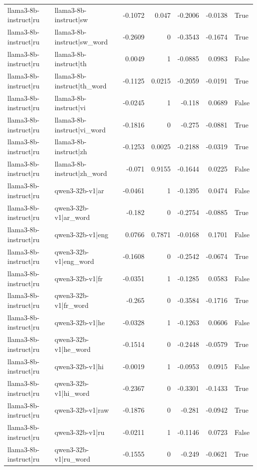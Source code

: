 \begin{table}
\begin{tabular}{l l r r r r l}
llama3-8b-instruct|ru & llama3-8b-instruct|sw & -0.1072 & 0.047 & -0.2006 & -0.0138 & True \\
llama3-8b-instruct|ru & llama3-8b-instruct|sw_word & -0.2609 & 0 & -0.3543 & -0.1674 & True \\
llama3-8b-instruct|ru & llama3-8b-instruct|th & 0.0049 & 1 & -0.0885 & 0.0983 & False \\
llama3-8b-instruct|ru & llama3-8b-instruct|th_word & -0.1125 & 0.0215 & -0.2059 & -0.0191 & True \\
llama3-8b-instruct|ru & llama3-8b-instruct|vi & -0.0245 & 1 & -0.118 & 0.0689 & False \\
llama3-8b-instruct|ru & llama3-8b-instruct|vi_word & -0.1816 & 0 & -0.275 & -0.0881 & True \\
llama3-8b-instruct|ru & llama3-8b-instruct|zh & -0.1253 & 0.0025 & -0.2188 & -0.0319 & True \\
llama3-8b-instruct|ru & llama3-8b-instruct|zh_word & -0.071 & 0.9155 & -0.1644 & 0.0225 & False \\
llama3-8b-instruct|ru & qwen3-32b-v1|ar & -0.0461 & 1 & -0.1395 & 0.0474 & False \\
llama3-8b-instruct|ru & qwen3-32b-v1|ar_word & -0.182 & 0 & -0.2754 & -0.0885 & True \\
llama3-8b-instruct|ru & qwen3-32b-v1|eng & 0.0766 & 0.7871 & -0.0168 & 0.1701 & False \\
llama3-8b-instruct|ru & qwen3-32b-v1|eng_word & -0.1608 & 0 & -0.2542 & -0.0674 & True \\
llama3-8b-instruct|ru & qwen3-32b-v1|fr & -0.0351 & 1 & -0.1285 & 0.0583 & False \\
llama3-8b-instruct|ru & qwen3-32b-v1|fr_word & -0.265 & 0 & -0.3584 & -0.1716 & True \\
llama3-8b-instruct|ru & qwen3-32b-v1|he & -0.0328 & 1 & -0.1263 & 0.0606 & False \\
llama3-8b-instruct|ru & qwen3-32b-v1|he_word & -0.1514 & 0 & -0.2448 & -0.0579 & True \\
llama3-8b-instruct|ru & qwen3-32b-v1|hi & -0.0019 & 1 & -0.0953 & 0.0915 & False \\
llama3-8b-instruct|ru & qwen3-32b-v1|hi_word & -0.2367 & 0 & -0.3301 & -0.1433 & True \\
llama3-8b-instruct|ru & qwen3-32b-v1|raw & -0.1876 & 0 & -0.281 & -0.0942 & True \\
llama3-8b-instruct|ru & qwen3-32b-v1|ru & -0.0211 & 1 & -0.1146 & 0.0723 & False \\
llama3-8b-instruct|ru & qwen3-32b-v1|ru_word & -0.1555 & 0 & -0.249 & -0.0621 & True \\

\end{tabular}
\end{table}
